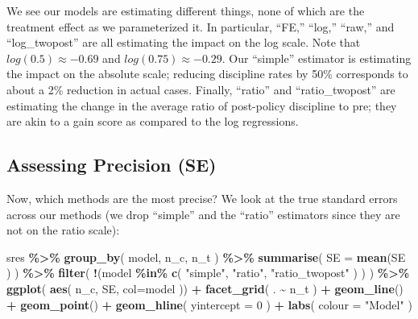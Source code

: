 \documentclass[
]{book}
\newenvironment{Shaded}{\begin{snugshade}}{\end{snugshade}}
\newcommand{\AttributeTok}[1]{\textcolor[rgb]{0.13,0.29,0.53}{#1}}
\newcommand{\DecValTok}[1]{\textcolor[rgb]{0.00,0.00,0.81}{#1}}
\newcommand{\FunctionTok}[1]{\textcolor[rgb]{0.13,0.29,0.53}{\textbf{#1}}}
\newcommand{\NormalTok}[1]{#1}
\newcommand{\SpecialCharTok}[1]{\textcolor[rgb]{0.81,0.36,0.00}{\textbf{#1}}}
\newcommand{\StringTok}[1]{\textcolor[rgb]{0.31,0.60,0.02}{#1}}
\begin{document}
We see our models are estimating different things, none of which are the treatment effect as we parameterized it.
In particular, ``FE,'' ``log,'' ``raw,'' and ``log\_twopost'' are all estimating the impact on the log scale.
Note that \(log( 0.5 ) \approx -0.69\) and \(log( 0.75 ) \approx -0.29\).
Our ``simple'' estimator is estimating the impact on the absolute scale; reducing discipline rates by 50\% corresponds to about a 2\% reduction in actual cases.
Finally, ``ratio'' and ``ratio\_twopost'' are estimating the change in the average ratio of post-policy discipline to pre; they are akin to a gain score as compared to the log regressions.

\subsection{Assessing Precision (SE)}\label{assessing-precision-se}

Now, which methods are the most precise?
We look at the true standard errors across our methods (we drop ``simple'' and the ``ratio'' estimators since they are not on the ratio scale):

\begin{Shaded}
\begin{Highlighting}[]
\NormalTok{sres }\SpecialCharTok{\%\textgreater{}\%} 
  \FunctionTok{group\_by}\NormalTok{( model, n\_c, n\_t ) }\SpecialCharTok{\%\textgreater{}\%}
  \FunctionTok{summarise}\NormalTok{( }\AttributeTok{SE =} \FunctionTok{mean}\NormalTok{(SE ) ) }\SpecialCharTok{\%\textgreater{}\%}
  \FunctionTok{filter}\NormalTok{( }\SpecialCharTok{!}\NormalTok{(model }\SpecialCharTok{\%in\%} \FunctionTok{c}\NormalTok{( }\StringTok{"simple"}\NormalTok{, }\StringTok{"ratio"}\NormalTok{, }\StringTok{"ratio\_twopost"}\NormalTok{ ) ) ) }\SpecialCharTok{\%\textgreater{}\%}
  \FunctionTok{ggplot}\NormalTok{( }\FunctionTok{aes}\NormalTok{( n\_c, SE, }\AttributeTok{col=}\NormalTok{model )) }\SpecialCharTok{+}
    \FunctionTok{facet\_grid}\NormalTok{( . }\SpecialCharTok{\textasciitilde{}}\NormalTok{ n\_t ) }\SpecialCharTok{+}
    \FunctionTok{geom\_line}\NormalTok{() }\SpecialCharTok{+} \FunctionTok{geom\_point}\NormalTok{() }\SpecialCharTok{+}
    \FunctionTok{geom\_hline}\NormalTok{( }\AttributeTok{yintercept =} \DecValTok{0}\NormalTok{ ) }\SpecialCharTok{+}
  \FunctionTok{labs}\NormalTok{( }\AttributeTok{colour =} \StringTok{"Model"}\NormalTok{ )}
\end{Highlighting}
\end{Shaded}
\end{document}
